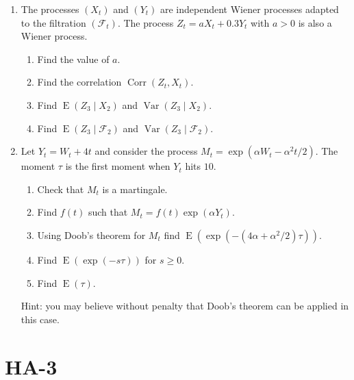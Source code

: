 \documentclass[12pt]{article}
\DeclareMathOperator{\Corr}{Corr}
\DeclareMathOperator{\Var}{Var}
\DeclareMathOperator{\E}{E}
\begin{document}
\begin{enumerate}
\item The processes $(X_t)$ and $(Y_t)$ are independent Wiener processes adapted to the filtration $(\mathcal{F}_t)$.
The process $Z_t = aX_t + 0.3 Y_t$ with $a>0$ is also a Wiener process. 
\begin{enumerate}
  \item Find the value of $a$.
  \item Find the correlation $\Corr(Z_t, X_t)$.
  \item Find $\E(Z_3 \mid X_2)$ and $\Var(Z_3 \mid X_2)$.
  \item Find $\E(Z_3 \mid \mathcal{F}_2)$ and $\Var(Z_3 \mid \mathcal{F}_2)$.
\end{enumerate}



\item Let $Y_t = W_t + 4t$ and consider the process $M_t = \exp(\alpha W_t - \alpha^2 t/2)$. 
The moment $\tau$ is the first moment when $Y_t$ hits $10$. 


\begin{enumerate}
  \item Check that $M_t$ is a martingale. 
  \item Find $f(t)$ such that $M_t = f(t) \exp(\alpha Y_t)$.
  \item Using Doob's theorem for $M_t$ find $\E(\exp(-(4\alpha +\alpha^2/2) \tau))$.
  \item Find $\E(\exp(-s \tau))$ for $s \geq 0$. 
  \item Find $\E(\tau)$.
\end{enumerate}
Hint: you may believe without penalty that Doob's theorem can be applied in this case. 

\end{enumerate}


\newpage
\section{HA-3}
\end{document}
